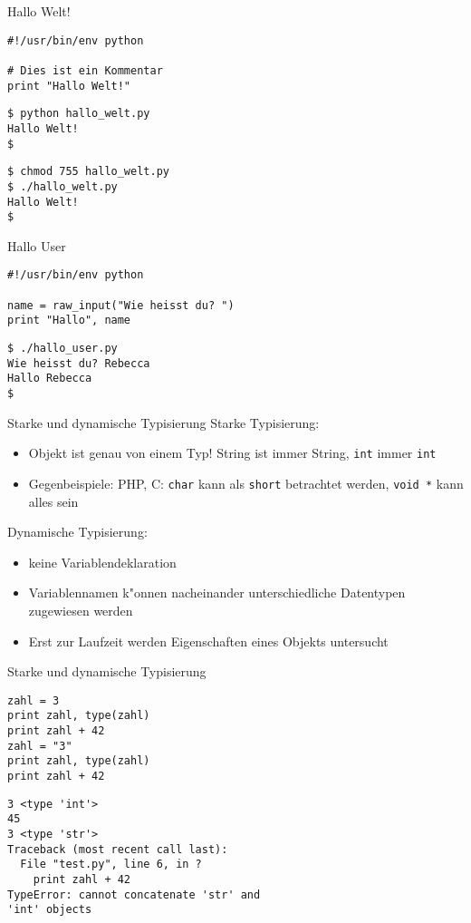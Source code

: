 \begin{frame}[fragile]{Hallo Welt!}
\begin{lstlisting}[style=Python]
#!/usr/bin/env python

# Dies ist ein Kommentar
print "Hallo Welt!"
\end{lstlisting}
\begin{lstlisting}[style=Shell]
$ python hallo_welt.py
Hallo Welt!
$
\end{lstlisting}%
\begin{lstlisting}[style=Shell]
$ chmod 755 hallo_welt.py
$ ./hallo_welt.py
Hallo Welt!
$
\end{lstlisting} %
\end{frame}

\begin{frame}[fragile]{Hallo User}
\begin{lstlisting}[style=Python]
#!/usr/bin/env python

name = raw_input("Wie heisst du? ")
print "Hallo", name
\end{lstlisting}
\begin{lstlisting}[style=Shell]
$ ./hallo_user.py
Wie heisst du? Rebecca
Hallo Rebecca
$
\end{lstlisting}
\end{frame}

\begin{frame}{Starke und dynamische Typisierung}
\alert{Starke Typisierung:}
\begin{itemize}
\item Objekt ist genau von einem Typ! String ist immer String, \texttt{int} immer \texttt{int}
\item Gegenbeispiele: PHP, C: \texttt{char} kann als \texttt{short} betrachtet werden, \texttt{void~*} kann alles sein
\end{itemize}
\alert{Dynamische Typisierung: }
\begin{itemize}
\item keine Variablendeklaration
\item Variablennamen k"onnen nacheinander unterschiedliche Datentypen zugewiesen werden
\item Erst zur Laufzeit werden Eigenschaften eines Objekts untersucht
\end{itemize}
\end{frame}

\begin{frame}[fragile]{Starke und dynamische Typisierung}
\begin{lstlisting}[style=Python]
zahl = 3
print zahl, type(zahl)
print zahl + 42
zahl = "3"
print zahl, type(zahl)
print zahl + 42
\end{lstlisting}
\begin{lstlisting}[style=Shell]
3 <type 'int'>
45
3 <type 'str'>
Traceback (most recent call last):
  File "test.py", line 6, in ?
    print zahl + 42
TypeError: cannot concatenate 'str' and 
'int' objects
\end{lstlisting}
\end{frame}


